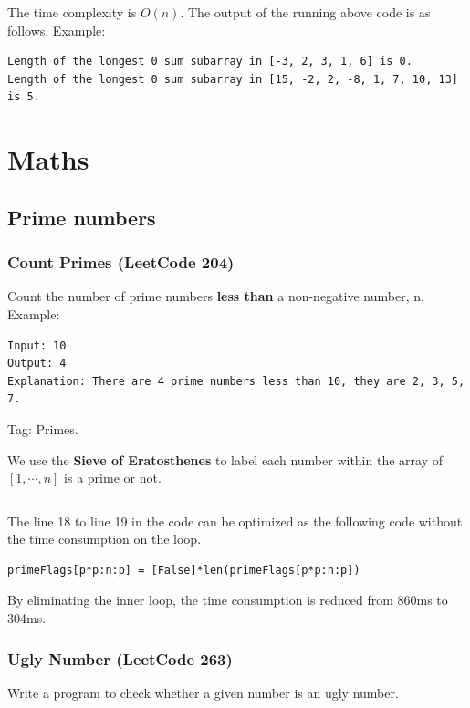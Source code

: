 \documentclass[11pt]{article}
\begin{document}
\inputminted[breaklines=true,frame=leftline, linenos=true]{python}{src/findLongestSubarraySum0.py}

The time complexity is $O(n)$.
The output of the running above code is as follows. 
Example:
\begin{verbatim}
Length of the longest 0 sum subarray in [-3, 2, 3, 1, 6] is 0.
Length of the longest 0 sum subarray in [15, -2, 2, -8, 1, 7, 10, 13] is 5.
\end{verbatim}


\section{Maths}
\subsection{Prime numbers}
\subsubsection{Count Primes (LeetCode 204)}
Count the number of prime numbers \textbf{less than} a non-negative number, n.
Example:
\begin{verbatim}
Input: 10
Output: 4
Explanation: There are 4 prime numbers less than 10, they are 2, 3, 5, 7.
\end{verbatim}

Tag: Primes.

We use the \textbf{Sieve of Eratosthenes} to label each number within the array of $[1, \cdots, n]$ is a prime or not.
\inputminted[breaklines=true,frame=leftline, linenos=true]{python}{src/countPrimes.py}

The line 18 to line 19 in the code can be optimized as the following code without the time consumption on the loop. 
\begin{verbatim}
primeFlags[p*p:n:p] = [False]*len(primeFlags[p*p:n:p])	
\end{verbatim}

By eliminating the inner loop, the time consumption is reduced from 860ms to 304ms. 

\subsubsection{Ugly Number (LeetCode 263)}
Write a program to check whether a given number is an ugly number.
\end{document}

